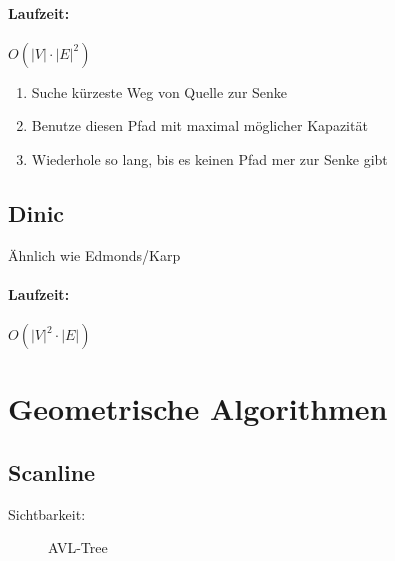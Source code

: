 \documentclass[11pt]{article}
\begin{document}
\paragraph{Laufzeit:} $O(|V|\cdot|E|^2)$

\begin{enumerate}[noitemsep]
	\item Suche kürzeste Weg von Quelle zur Senke
	\item Benutze diesen Pfad mit maximal möglicher Kapazität
	\item Wiederhole so lang, bis es keinen Pfad mer zur Senke gibt
\end{enumerate}

\subsection{Dinic}

Ähnlich wie Edmonds/Karp

\paragraph{Laufzeit:} $O(|V|^2\cdot|E|)$

\section{Geometrische Algorithmen}

\subsection{Scanline}

\begin{description}
	\item[Sichtbarkeit:] AVL-Tree
\end{description}
\end{document}
